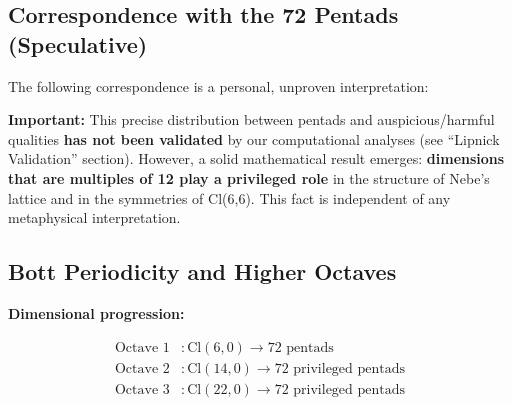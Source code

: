 \documentclass[11pt]{article}
\begin{document}
\hypertarget{correspondence-with-the-72-pentads-speculative}{%
\subsection{Correspondence with the 72 Pentads
(Speculative)}\label{correspondence-with-the-72-pentads-speculative}}

The following correspondence is a personal, unproven interpretation:

\begin{center}
\end{center}

\textbf{Important:} This precise distribution between pentads and
auspicious/harmful qualities \textbf{has not been validated} by our
computational analyses (see ``Lipnick Validation'' section). However, a
solid mathematical result emerges: \textbf{dimensions that are multiples
of 12 play a privileged role} in the structure of Nebe's lattice and in
the symmetries of Cl(6,6). This fact is independent of any metaphysical
interpretation.

\hypertarget{bott-periodicity-and-higher-octaves}{%
\subsection{Bott Periodicity and Higher
Octaves}\label{bott-periodicity-and-higher-octaves}}

\textbf{Dimensional progression:}

\begin{align*}
\text{Octave 1} &: \text{Cl}(6,0) \rightarrow 72 \text{ pentads} \\
\text{Octave 2} &: \text{Cl}(14,0) \rightarrow 72 \text{ privileged pentads} \\
\text{Octave 3} &: \text{Cl}(22,0) \rightarrow 72 \text{ privileged pentads}
\end{align*}
\end{document}
